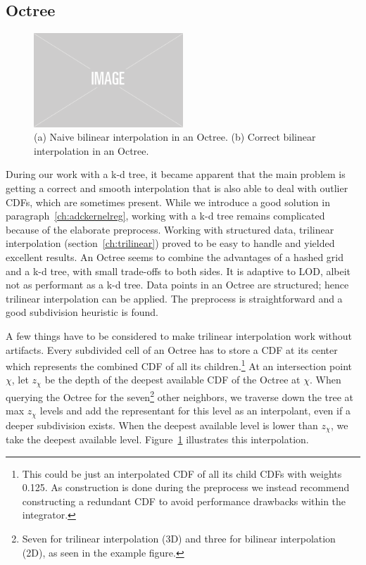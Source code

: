 \subsection{Octree}
\label{ch:octree}

\begin{figure}
    \centering
    \includegraphics[width=0.5\textwidth]{figures/img-placeholder.png}
    \caption{(a) Naive bilinear interpolation in an Octree. (b) Correct bilinear interpolation in an Octree.}
    \label{fig:trilinearoctree}
\end{figure}

During our work with a k-d tree, it became apparent that the main problem is getting a correct and smooth interpolation that is also able to deal with outlier CDFs, which are sometimes present. While we introduce a good solution in paragraph~\ref{ch:adckernelreg}, working with a k-d tree remains complicated because of the elaborate preprocess. Working with structured data, trilinear interpolation (section~\ref{ch:trilinear}) proved to be easy to handle and yielded excellent results. An Octree seems to combine the advantages of a hashed grid and a k-d tree, with small trade-offs to both sides. It is adaptive to LOD, albeit not as performant as a k-d tree. Data points in an Octree are structured; hence trilinear interpolation can be applied. The preprocess is straightforward and a good subdivision heuristic is found.

A few things have to be considered to make trilinear interpolation work without artifacts. Every subdivided cell of an Octree has to store a CDF at its center which represents the combined CDF of all its children.\footnote{This could be just an interpolated CDF of all its child CDFs with weights 0.125. As construction is done during the preprocess we instead recommend constructing a redundant CDF to avoid performance drawbacks within the integrator.} At an intersection point $\chi$, let $z_\chi$ be the depth of the deepest available CDF of the Octree at $\chi$. When querying the Octree for the seven\footnote{Seven for trilinear interpolation (3D) and three for bilinear interpolation (2D), as seen in the example figure.} other neighbors, we traverse down the tree at max $z_\chi$ levels and add the representant for this level as an interpolant, even if a deeper subdivision exists. When the deepest available level is lower than $z_\chi$, we take the deepest available level. Figure~\ref{fig:trilinearoctree} illustrates this interpolation.


